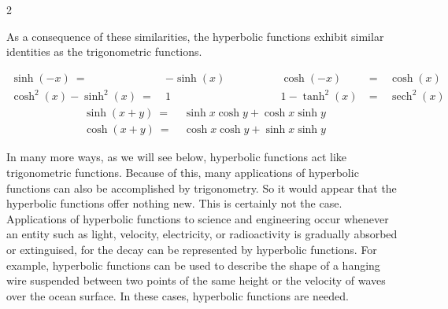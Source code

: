 \documentclass{book}
\DeclareMathOperator{\sech}{sech}
\begin{document}
\begin{multicols}{2}
\begin{center}
\end{center}
\begin{center}
\end{center}
\end{multicols}

As a consequence of these similarities, the hyperbolic functions exhibit similar identities as the trigonometric functions.

\begin{Prop}
\[\begin{alignedat}{100}
\sinh(-x)\ =\ & -\sinh(x)\ &\qquad\qquad \cosh(-x)\ &=\ & \cosh(x)\\
\cosh^2(x) - \sinh^2(x)\ =\ & 1 &\qquad\qquad 1 - \tanh^2(x)\ &=\ & \sech^2(x)
\end{alignedat}\]
\[\begin{alignedat}{100}
\sinh(x+y)\ =\ & \sinh x\cosh y + \cosh x\sinh y\\
\cosh(x+y)\ =\ & \cosh x\cosh y + \sinh x \sinh y
\end{alignedat}
\]
\end{Prop}\vs

In many more ways, as we will see below, hyperbolic functions act like trigonometric functions. Because of this, many applications of hyperbolic functions can also be accomplished by trigonometry. So it would appear that the hyperbolic functions offer nothing new. This is certainly not the case. Applications of hyperbolic functions to science and engineering occur whenever an entity such as light, velocity, electricity, or radioactivity is gradually absorbed or extinguised, for the decay can be represented by hyperbolic functions. For example, hyperbolic functions can be used to describe the shape of a hanging wire suspended between two points of the same height or the velocity of waves over the ocean surface. In these cases, hyperbolic functions are needed.
\end{document}
